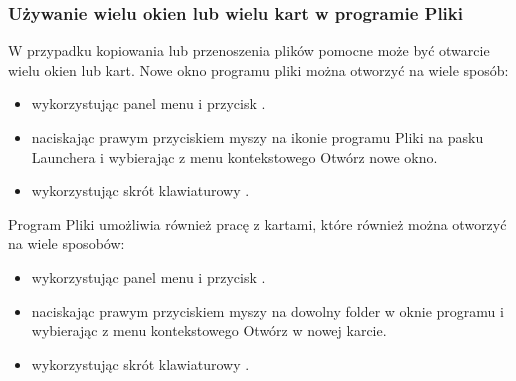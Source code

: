 \subsubsection{Używanie wielu okien lub wielu kart w programie Pliki}
W przypadku kopiowania lub przenoszenia plików pomocne może być otwarcie wielu okien lub kart. Nowe okno programu pliki można otworzyć na wiele sposób:
\begin{itemize}
\item wykorzystując panel menu i przycisk .
\item naciskając prawym przyciskiem myszy na ikonie programu Pliki na pasku Launchera i wybierając z menu kontekstowego \textcolor{ubuntu_orange}{Otwórz nowe okno}.
\item wykorzystując skrót klawiaturowy .
\end{itemize}
Program Pliki umożliwia również pracę z kartami, które również można otworzyć na wiele sposobów:
\begin{itemize}
\item wykorzystując panel menu i przycisk .
\item naciskając prawym przyciskiem myszy na dowolny folder w oknie programu i wybierając z menu kontekstowego \textcolor{ubuntu_orange}{Otwórz w nowej karcie}.
\item wykorzystując skrót klawiaturowy .
\end{itemize}

\clearpage